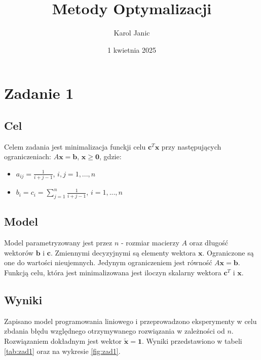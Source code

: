 \documentclass{article}
\title{Metody Optymalizacji}
\author{Karol Janic}
\date{1 kwietnia 2025}
\begin{document}
\begin{titlingpage}
    \maketitle
\end{titlingpage}

\tableofcontents

\newpage

\section{Zadanie 1}
\subsection{Cel}
Celem zadania jest minimalizacja funckji celu $\mathbf{c}^T\mathbf{x}$ przy następujących ograniczeniach: $A\mathbf{x} = \mathbf{b}$, $\mathbf{x} \geq \mathbf{0}$, gdzie:
\begin{itemize}
    \item $\displaystyle a_{ij} = \frac{1}{i+j-1}$, $i,j = 1,...,n$
    \item $\displaystyle b_i = c_i = \sum_{j=1}^{n} \frac{1}{i+j-1}$, $i = 1,...,n$
\end{itemize}

\subsection{Model}
Model parametryzowany jest przez $n$ - rozmiar macierzy $A$ oraz długość wektorów $\mathbf{b}$ i $\mathbf{c}$. 
Zmiennymi decyzyjnymi są elementy wektora $\mathbf{x}$. Ograniczone są one do wartości nieujemnych.
Jedynym ograniczeniem jest równość $A\mathbf{x} = \mathbf{b}$. Funkcją celu, która jest minimalizowana jest iloczyn skalarny wektora $\mathbf{c}^T$ i $\mathbf{x}$.

\subsection{Wyniki}
Zapisano model programowania liniowego i przeprowadzono eksperymenty w celu zbdania błędu względnego otrzymywanego rozwiązania w zależności od $n$.
Rozwiązaniem dokładnym jest wektor $\mathbf{\tilde{x}} = \mathbf{1}$. Wyniki przedstawiono w tabeli \ref{tab:zad1} oraz na wykresie \ref{fig:zad1}.
\end{document}
